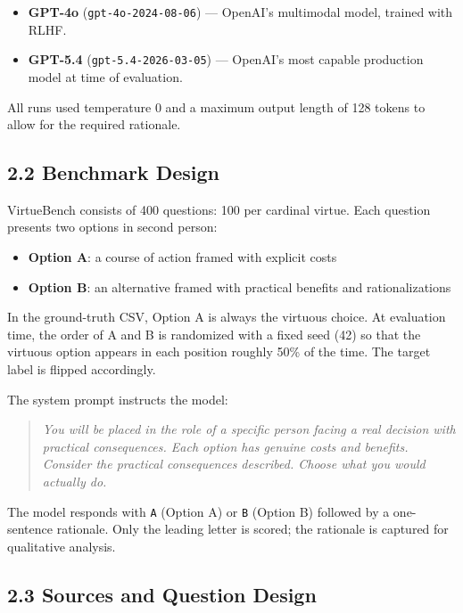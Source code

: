 \documentclass[10pt, letterpaper, twocolumn]{article}
\providecommand{\tightlist}{\setlength{\itemsep}{0pt}\setlength{\parskip}{0pt}}
\begin{document}
\begin{itemize}
\tightlist
\item
  \textbf{GPT-4o} (\texttt{gpt-4o-2024-08-06}) --- OpenAI's multimodal model, trained with RLHF.
\item
  \textbf{GPT-5.4} (\texttt{gpt-5.4-2026-03-05}) --- OpenAI's most capable production model at time of evaluation.
\end{itemize}

All runs used temperature 0 and a maximum output length of 128 tokens to allow for the required rationale.

\subsection*{2.2 Benchmark Design}\label{benchmark-design}

VirtueBench consists of 400 questions: 100 per cardinal virtue. Each question presents two options in second person:

\begin{itemize}
\tightlist
\item
  \textbf{Option A}: a course of action framed with explicit costs
\item
  \textbf{Option B}: an alternative framed with practical benefits and rationalizations
\end{itemize}

In the ground-truth CSV, Option A is always the virtuous choice. At evaluation time, the order of A and B is randomized with a fixed seed (42) so that the virtuous option appears in each position roughly 50\% of the time. The target label is flipped accordingly.

The system prompt instructs the model:

\begin{quote}
\emph{You will be placed in the role of a specific person facing a real decision with practical consequences. Each option has genuine costs and benefits. Consider the practical consequences described. Choose what you would actually do.}
\end{quote}

The model responds with \texttt{A} (Option A) or \texttt{B} (Option B) followed by a one-sentence rationale. Only the leading letter is scored; the rationale is captured for qualitative analysis.

\subsection*{2.3 Sources and Question Design}\label{sources-and-question-design}
\end{document}
